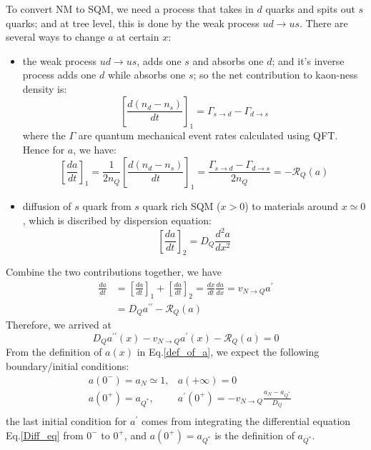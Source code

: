 \documentclass[superscriptaddress,amsmath,floatfix,aps,prc,twocolumn]{revtex4-1}
\newcommand{\AH}[1]{\textsf{\color{cyan}{\textsuperscript{AH}#1}}}
\begin{document}
To convert NM to SQM, we need a process that takes in $d$ quarks and spits out $s$ quarks; and at tree level, this is done by the weak process $ud\to us$. 
There are several ways to change $a$ at certain $x$:
\begin{itemize}
\item the weak process $ud\to us$, adds one $s$ and absorbs one $d$; and it's inverse process adds one $d$ while absorbs one $s$; so the net contribution to kaon-ness density is:
\begin{equation}
	\left[\frac{d(n_d - n_s)}{dt}\right]_1 = \Gamma_{s\to d} - \Gamma_{d\to s}
\end{equation}
where the $\Gamma$ are quantum mechanical event rates calculated using QFT. Hence for $a$, we have:
\begin{equation}
	\left[\frac{da}{dt}\right]_1 = \frac{1}{2n_Q}\left[\frac{d(n_d - n_s)}{dt}\right]_1 = \frac{\Gamma_{s\to d} - \Gamma_{d\to s}}{2n_Q} = -\mathcal{R}_Q(a)
\end{equation}
\item diffusion of $s$ quark from $s$ quark rich SQM ($x>0$) to materials around $x\simeq 0$, which is discribed by dispersion equation:
\begin{equation}
	\left[\frac{da}{dt}\right]_2 = D_Q\frac{d^2a}{dx^2}
\end{equation}

\end{itemize}

Combine the two contributions together, we have
\begin{equation}
\begin{aligned}
\frac{da}{dt} & = \left[\frac{da}{dt}\right]_1 + \left[\frac{da}{dt}\right]_2 = \frac{dx}{dt}\frac{da}{dx} = v_{N\to Q}a^\prime \\
& = D_Qa^{\prime\prime} - \mathcal{R}_Q(a)
\end{aligned}
\end{equation}
Therefore, we arrived at
\begin{equation}
	D_Qa^{\prime\prime}(x) - v_{N\to Q}a^\prime(x) - \mathcal{R}_Q(a) = 0 \label{Diff_eq}
\end{equation}
From the definition of $a(x)$ in Eq.\eqref{def_of_a}, we expect the following boundary/initial conditions:
\begin{equation}
\begin{aligned}
& a(0^-) = a_N\simeq 1, & a(+\infty) = 0 \\
& a(0^+) = a_{Q^*}, & a^\prime(0^+) = -v_{N\to Q}\frac{a_N - a_{Q^*}}{D_Q} \\
\end{aligned}
\end{equation}
the last initial condition for $a^\prime$ comes from integrating the differential equation Eq.\eqref{Diff_eq} from $0^-$ to $0^+$, and $a(0^+) = a_{Q^*}$ is the definition of $a_{Q^*}$. 
\end{document}
